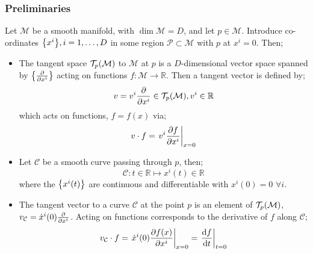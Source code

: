\subsubsection{Preliminaries}
Let $\mathcal{M}$ be a smooth manifold, with $\dim \mathcal{M} = D$, and let $p \in \mathcal{M}$. Introduce co-ordinates $\set{x^i}, i = 1, \ldots, D$ in some region $\mathcal{P} \subset \mathcal{M}$ with $p$ at $x^i = 0$. Then;
\begin{itemize}
\item The tangent space $\mathcal{T}_p(\mathcal{M})$ to $\mathcal{M}$ at $p$ is a $D$-dimensional vector space spanned by $\set{\tfrac{\del}{\del x^i}}$ acting on functions $f : \mathcal{M} \rightarrow \mathbb{R}$. Then a tangent vector is defined by;
\begin{equation}
v = v^i \frac{\partial}{\partial x^i} \in \mathcal{T}_p(\mathcal{M}), v^i \in \mathbb{R}
\end{equation}
which acts on functions, $f = f(x)$ via;
\begin{equation}
v \cdot f = \left.v^i \frac{\del f}{\del x^i}\right|_{x = 0}
\end{equation}
\item Let $\mathcal{C}$ be a smooth curve passing through $p$, then;
\begin{equation*}
\mathcal{C} : t \in \mathbb{R} \mapsto x^i(t) \in \mathbb{R}
\end{equation*}
where the $\set{x^i(t)}$ are continuous and differentiable with $x^i(0) = 0 \,\, \forall i$.
\item The tangent vector to a curve $\mathcal{C}$ at the point $p$ is an element of $\mathcal{T}_p(\mathcal{M})$, $v_{\mathcal{C}} = \dot{x}^i(0)\tfrac{\partial}{\partial x^i}$. Acting on functions corresponds to the derivative of $f$ along $\mathcal{C}$;
\begin{equation}
v_{\mathcal{C}} \cdot f = \left.\dot{x}^i(0) \frac{\del f(x)}{\del x^i}\right|_{x=0} = \left.\frac{\ud f}{\ud t}\right|_{t = 0}
\end{equation}
\end{itemize}
